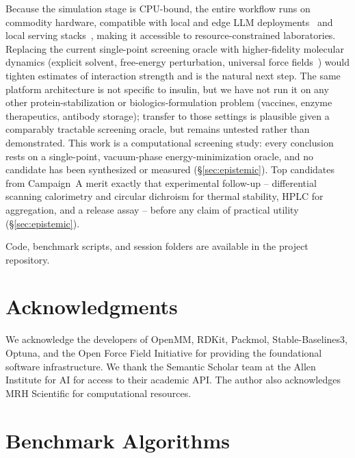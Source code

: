 \documentclass[twocolumn]{fairmeta}
\begin{document}
Because the simulation stage is CPU-bound, the entire workflow runs on commodity hardware, compatible with local and edge LLM deployments~\cite{xu2024ondevice,qu2024mobileedge} and local serving stacks~\cite{ollama2023}, making it accessible to resource-constrained laboratories.
Replacing the current single-point screening oracle with higher-fidelity molecular dynamics (explicit solvent, free-energy perturbation, universal force fields~\cite{wood2025uma}) would tighten estimates of interaction strength and is the natural next step.
The same platform architecture is not specific to insulin, but we have not run it on any other protein-stabilization or biologics-formulation problem (vaccines, enzyme therapeutics, antibody storage); transfer to those settings is plausible given a comparably tractable screening oracle, but remains untested rather than demonstrated.
This work is a computational screening study: every conclusion rests on a single-point, vacuum-phase energy-minimization oracle, and no candidate has been synthesized or measured (\S\ref{sec:epistemic}).
Top candidates from Campaign~A merit exactly that experimental follow-up -- differential scanning calorimetry and circular dichroism for thermal stability, HPLC for aggregation, and a release assay -- before any claim of practical utility (\S\ref{sec:epistemic}).

Code, benchmark scripts, and session folders are available in the project repository.

\section{Acknowledgments}

We acknowledge the developers of OpenMM, RDKit, Packmol, Stable-Baselines3, Optuna, and the Open Force Field Initiative for providing the foundational software infrastructure.
We thank the Semantic Scholar team at the Allen Institute for AI for access to their academic API.
The author also acknowledges MRH Scientific for computational resources.




\appendix

\section{Benchmark Algorithms}
\label{app:algorithms}
\end{document}
